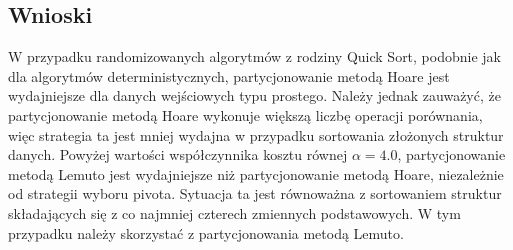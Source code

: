 \begin{figure}[]
	\centering
	
	\caption[]{}
	\label{fig:quick-sort-nondeterministic-pivot-random}
\end{figure}

\begin{figure}[]
	\centering
	
	\caption[]{}
	\label{fig:quick-sort-nondeterministic-pivot-reversed}
\end{figure}

\begin{figure}[]
	\centering
	
	\caption[]{}
	\label{fig:quick-sort-nondeterministic-pivot-cost-factor}
\end{figure}

\begin{figure}[]
	\centering
	
	\caption[]{}
	\label{fig:quick-sort-nondeterministic-pivot-density}
\end{figure}

\begin{figure}[]
	\centering
	
	\caption[]{}
	\label{fig:quick-sort-nondeterministic-pivot-random-all}
\end{figure}

\subsection{Wnioski}
W przypadku randomizowanych algorytmów z rodziny Quick Sort, podobnie jak dla algorytmów deterministycznych, partycjonowanie metodą Hoare jest wydajniejsze dla danych wejściowych typu prostego. Należy jednak zauważyć, że partycjonowanie metodą Hoare wykonuje większą liczbę operacji porównania, więc strategia ta jest mniej wydajna w przypadku sortowania złożonych struktur danych. Powyżej wartości współczynnika kosztu równej $\alpha = 4.0$, partycjonowanie metodą Lemuto jest wydajniejsze niż partycjonowanie metodą Hoare, niezależnie od strategii wyboru pivota. Sytuacja ta jest równoważna z sortowaniem struktur składających się z co najmniej czterech zmiennych podstawowych. W tym przypadku należy skorzystać z partycjonowania metodą Lemuto.\\

